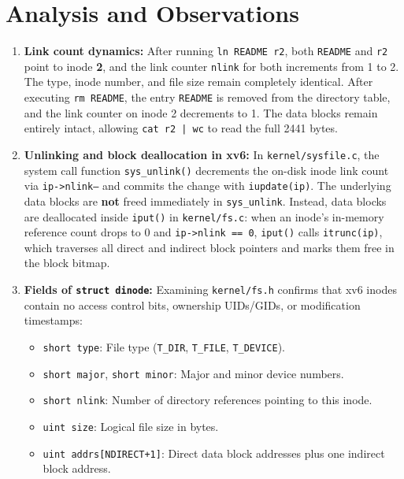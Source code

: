 \documentclass[12pt,a4paper]{report}
\numberwithin{equation}{chapter}
\numberwithin{figure}{chapter}
\numberwithin{table}{chapter}
\begin{document}
\section{Analysis and Observations}
\begin{enumerate}
    \item \textbf{Link count dynamics:}
    After running \texttt{ln README r2}, both \texttt{README} and \texttt{r2} point to inode \textbf{2}, and the link counter \texttt{nlink} for both increments from 1 to 2. The type, inode number, and file size remain completely identical. After executing \texttt{rm README}, the entry \texttt{README} is removed from the directory table, and the link counter on inode 2 decrements to 1. The data blocks remain entirely intact, allowing \texttt{cat r2 | wc} to read the full 2441 bytes.
    \item \textbf{Unlinking and block deallocation in xv6:}
    In \texttt{kernel/sysfile.c}, the system call function \texttt{sys\_unlink()} decrements the on-disk inode link count via \texttt{ip->nlink--} and commits the change with \texttt{iupdate(ip)}. The underlying data blocks are \textbf{not} freed immediately in \texttt{sys\_unlink}. Instead, data blocks are deallocated inside \texttt{iput()} in \texttt{kernel/fs.c}: when an inode's in-memory reference count drops to 0 and \texttt{ip->nlink == 0}, \texttt{iput()} calls \texttt{itrunc(ip)}, which traverses all direct and indirect block pointers and marks them free in the block bitmap.
    \item \textbf{Fields of \texttt{struct dinode}:}
    Examining \texttt{kernel/fs.h} confirms that xv6 inodes contain no access control bits, ownership UIDs/GIDs, or modification timestamps:
    \begin{itemize}
        \item \texttt{short type}: File type (\texttt{T\_DIR}, \texttt{T\_FILE}, \texttt{T\_DEVICE}).
        \item \texttt{short major}, \texttt{short minor}: Major and minor device numbers.
        \item \texttt{short nlink}: Number of directory references pointing to this inode.
        \item \texttt{uint size}: Logical file size in bytes.
        \item \texttt{uint addrs[NDIRECT+1]}: Direct data block addresses plus one indirect block address.
    \end{itemize}
\end{enumerate}
\end{document}
